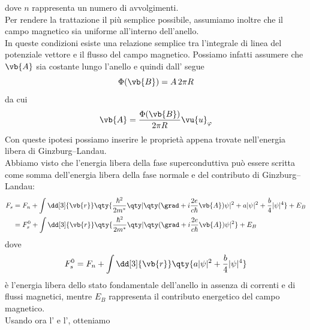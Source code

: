 dove $n$ rappresenta un numero di avvolgimenti.\\
Per rendere la trattazione il più semplice possibile, assumiamo inoltre che il campo magnetico sia uniforme all'interno dell'anello.\\
In queste condizioni esiste una relazione semplice tra l'integrale di linea del potenziale vettore e il flusso del campo magnetico. Possiamo infatti assumere che $\vb{A}$ sia costante lungo l'anello e quindi dall' segue
\begin{equation*}
   \Phi(\vb{B}) = A\,2\pi R
\end{equation*}
da cui
\begin{equation}
   \vb{A} = \frac{\Phi(\vb{B})}{2\pi R}\vu{u}_{\varphi}
   \label{eq:vector_potential_ring}
\end{equation}
Con queste ipotesi possiamo inserire le proprietà appena trovate nell'energia libera di Ginzburg--Landau.\\
Abbiamo visto che l'energia libera della fase superconduttiva può essere scritta come somma dell'energia libera della fase normale e del contributo di Ginzburg--Landau:
\begin{equation*}
   \begin{split}
      F_s
      &=
      F_n
      +
      \int \dd[3]{\vb{r}}
      \qty{
      \frac{\hbar^2}{2m^*}
      \qty|
      \qty(
         \grad
         +
         i\frac{2e}{c\hbar}\vb{A}
      )\psi
      |^2
      +
      a|\psi|^2
      +
      \frac{b}{4}|\psi|^4
      }
      +
      E_B
      \\
      &=
      F_s^0
      +
      \int \dd[3]{\vb{r}}
      \qty{
      \frac{\hbar^2}{2m^*}
      \qty|
      \qty(
         \grad
         +
         i\frac{2e}{c\hbar}\vb{A}
      )\psi
      |^2
      }
      +
      E_B
   \end{split}
\end{equation*}
dove
\begin{equation*}
   F_s^0
   =
   F_n
   +
   \int \dd[3]{\vb{r}}
   \qty{
   a|\psi|^2
   +
   \frac{b}{4}|\psi|^4
   }
\end{equation*}
è l'energia libera dello stato fondamentale dell'anello in assenza di correnti e di flussi magnetici, mentre $E_B$ rappresenta il contributo energetico del campo magnetico.\\
Usando ora l' e l', otteniamo
